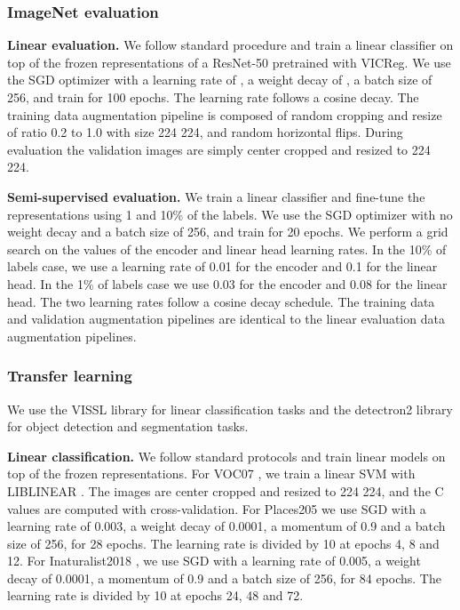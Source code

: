 \documentclass{article}
\newcommand{\algo}{VICReg}
\begin{document}
\subsubsection{ImageNet evaluation} \label{app:eval_imnet}

\textbf{Linear evaluation.} We follow standard procedure and train a linear classifier on top of the frozen representations of a ResNet-50 pretrained with \algo. We use the SGD optimizer with a learning rate of , a weight decay of , a batch size of 256, and train for 100 epochs. The learning rate follows a cosine decay. The training data augmentation pipeline is composed of random cropping and resize of ratio 0.2 to 1.0 with size 224  224, and random horizontal flips. During evaluation the validation images are simply center cropped and resized to 224  224.

\textbf{Semi-supervised evaluation.} We train a linear classifier and fine-tune the representations using 1 and 10\% of the labels. We use the SGD optimizer with no weight decay and a batch size of 256, and train for 20 epochs. We perform a grid search on the values of the encoder and linear head learning rates. In the 10\% of labels case, we use a learning rate of 0.01 for the encoder and 0.1 for the linear head. In the 1\% of labels case we use 0.03 for the encoder and 0.08 for the linear head. The two learning rates follow a cosine decay schedule. The training data and validation augmentation pipelines are identical to the linear evaluation data augmentation pipelines.

\subsubsection{Transfer learning} \label{app:transfer_other}

We use the VISSL library \cite{goyal2021vissl} for linear classification tasks and the detectron2 library \cite{wu2019detectron2} for object detection and segmentation tasks.

\textbf{Linear classification.} We follow standard protocols \cite{misra2020pirl, caron2020swav, zbontar2021barlow} and train linear models on top of the frozen representations. For VOC07 \cite{everingham2010voc}, we train a linear SVM with LIBLINEAR \cite{fan2008liblinear}. The images are center cropped and resized to 224  224, and the C values are computed with cross-validation. For Places205 \cite{zhou2014places} we use SGD with a learning rate of 0.003, a weight decay of 0.0001, a momentum of 0.9 and a batch size of 256, for 28 epochs. The learning rate is divided by 10 at epochs 4, 8 and 12. For Inaturalist2018 \cite{vanhorni2018naturalist}, we use SGD with a learning rate of 0.005, a weight decay of 0.0001, a momentum of 0.9 and a batch size of 256, for 84 epochs. The learning rate is divided by 10 at epochs 24, 48 and 72.
\end{document}
